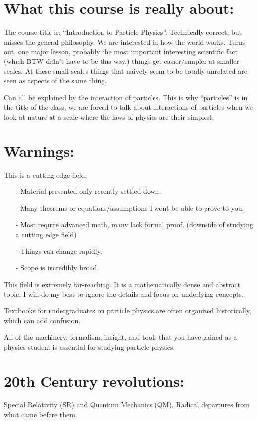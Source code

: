 {\fontsize{14}{16}\selectfont

\section{What this course is really about:}
The course title is: ``Introduction to Particle Physics''.
Technically correct, but misses the general philosophy. 
We are interested in how the world works. 
Turns out, one major lesson, probably the most important interesting scientific fact (which BTW didn't have to be this way.) things get easier/simpler at smaller scales. 
At these small scales things that naively seem to be totally unrelated are seen as aspects of the same thing. 

Can all be explained by the interaction of particles. 
This is why ``particles'' is in the title of the class, we are forced to talk about interactions of particles when we look at nature at a scale where the laws of physics are their simplest. 

\section{Warnings:}
This is a cutting edge field. 
\begin{itemize}
\item[-] Material presented only recently settled down. 
\item[-] Many theorems or equations/assumptions I wont be able to prove to you. 
\item[-] Most require advanced math, many lack formal proof.  (downside of studying a cutting edge field)
\item[-] Things can change rapidly. 
\item[-] Scope is incredibly broad. 
\end{itemize}

This field is extremely far-reaching. 
It is a mathematically dense and abstract topic. 
I will do my best to ignore the details and focus on underlying concepts.

Textbooks for undergraduates on particle physics are often organized historically, which can add confusion. 

All of the machinery, formalism, insight, and tools that you have gained as a physics student is essential for studying particle physics.


\section{20th Century revolutions:}
Special Relativity (SR) and Quantum Mechanics (QM).
Radical departures from what came before them.

}
